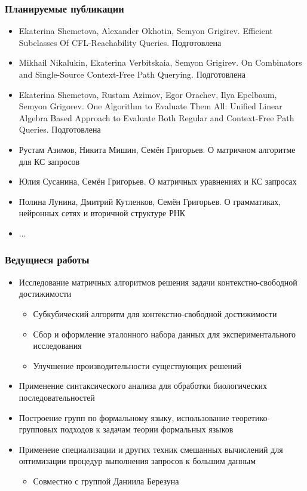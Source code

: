 \documentclass[xcolor=table]{beamer}
\begin{document}
\begin{frame}[fragile]

  \frametitle{Планируемые публикации}
\begin{itemize}
      \item[\faHourglassHalf] Ekaterina Shemetova, Alexander Okhotin, Semyon Grigirev. Efficient Subclasses Of CFL-Reachability Queries. Подготовлена
      \item[\faHourglassHalf] Mikhail Nikalukin, Ekaterina Verbitskaia, Semyon Grigirev. On Combinators and Single-Source Context-Free Path Querying. Подготовлена
      \item[\faHourglassHalf] Ekaterina Shemetova, Rustam Azimov, Egor Orachev, Ilya Epelbaum, Semyon Grigorev. One Algorithm to Evaluate Them All: Unified Linear Algebra Based Approach to Evaluate Both Regular and Context-Free Path Queries. Подготовлена
      \pause
      \item[\faGears] Рустам Азимов, Никита Мишин, Семён Григорьев. О матричном алгоритме для КС запросов
      \item[\faGears] Юлия Сусанина, Семён Григорьев. О матричных уравнениях и КС запросах
      \item[\faGears] Полина Лунина, Дмитрий Кутленков, Семён Григорьев. О грамматиках, нейронных сетях и вторичной структуре РНК
      \item[\faGears] $\ldots$
\end{itemize}
\end{frame}

\begin{frame}[fragile]

  \frametitle{Ведущиеся работы}
\begin{itemize}
      \item Исследование матричных алгоритмов решения задачи контекстно-свободной достижимости
      \begin{itemize}
        \item Субкубический алгоритм для контекстно-свободной достижимости
        \item Сбор и оформление эталонного набора данных для экспериментального исследования
        \item Улучшение производительности существующих решений
      \end{itemize}
      \item Применение синтаксического анализа для обработки биологических последовательностей
      \item Построение групп по формальному языку, использование теоретико-групповых подходов к задачам теории формальных языков
      \item Применеие специализации и других техник смешанных вычислений для оптимизации процедур выполнения запросов к большим данным
      \begin{itemize}
        \item Совместно с группой Даниила Березуна
      \end{itemize}
\end{itemize}
\end{frame}
\end{document}
